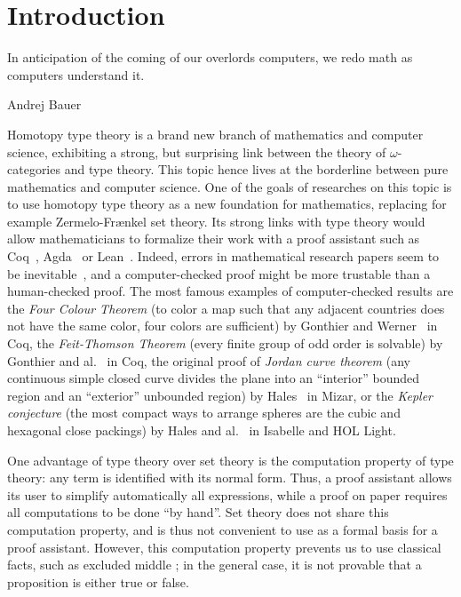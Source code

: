 \chapter{Introduction}
\label{chap:intro} \epigraph{In anticipation of the coming of our
overlords computers, we redo math as computers understand it.}{Andrej
Bauer}

Homotopy type theory is a brand new branch of mathematics and computer
science, exhibiting a strong, but surprising link between the theory
of $\omega$-categories and type theory. This topic hence lives at the
borderline between pure mathematics and computer science. One of the
goals of researches on this topic is to use homotopy type theory as a
new foundation for mathematics, replacing for example Zermelo-Frænkel
set theory. Its strong links with type theory would allow
mathematicians to formalize their work with a proof assistant such as
Coq~\cite{coq:refman:8.4}, Agda~\cite{norell2007towards} or
Lean~\cite{lean}. Indeed, errors in mathematical research papers seem
to be inevitable~\cite{vv-univ-f}, and a computer-checked proof might
be more trustable than a human-checked proof.  The most famous
examples of computer-checked results are the {\em Four Colour Theorem}
(to color a map such that any adjacent countries does not have the
same color, four colors are sufficient) by Gonthier and
Werner~\cite{gonthier-four-color} in Coq, the {\em Feit-Thomson
Theorem} (every finite group of odd order is solvable) by Gonthier and
al.~\cite{gonthier-feit} in Coq, the original proof of {\em Jordan curve
theorem} (any continuous simple closed curve divides the plane into an
``interior'' bounded region and an ``exterior'' unbounded region) by
Hales~\cite{hales-jordan} in Mizar, or the {\em Kepler conjecture}
(the most compact ways to arrange spheres are the cubic and hexagonal
close packings) by Hales and al.~\cite{hales-kepler} in Isabelle and
HOL Light.

One advantage of type theory over set theory is the computation
property of type theory: any term is identified with its normal
form. Thus, a proof assistant allows its user to simplify
automatically all expressions, while a proof on paper requires all
computations to be done ``by hand''. Set theory does not share this
computation property, and is thus not convenient to use as a formal
basis for a proof assistant. However, this computation property
prevents us to use classical facts, such as excluded middle ; in the
general case, it is not provable that a proposition is either true or
false.

